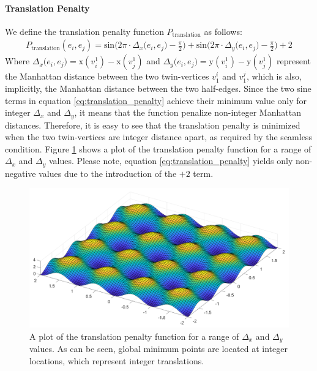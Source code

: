 \paragraph{Translation Penalty}
\label{paragraph:translation_penalty_function_method}
We define the translation penalty function $P_{\mathrm{translation}}$ as follows:
\begin{equation}\label{eq:translation_penalty}
\begin{split}
P_{\mathrm{translation}}\left(e_i,e_j\right) = \mathrm{sin} \Big( 2\pi\cdot\Delta_x\big(e_i,e_j\big) - \frac{\pi}{2}\Big) + \mathrm{sin} \Big( 2\pi\cdot\Delta_y\big(e_i,e_j\big) - \frac{\pi}{2}\Big) + 2
\end{split}
\end{equation}
Where $\Delta_x\big(e_i,e_j\big) = \mathrm{x}\left(v_i^1\right) - \mathrm{x}\left(v_j^1\right)$ and $\Delta_y\big(e_i,e_j\big) = \mathrm{y}\left(v_i^1\right) - \mathrm{y}\left(v_j^1\right)$ represent the Manhattan distance between the two twin-vertices $v^i_1$ and $v^j_1$, which is also, implicitly, the Manhattan distance between the two half-edges. Since the two sine terms in equation \ref{eq:translation_penalty} achieve their minimum value only for integer $\Delta_x$ and $\Delta_y$, it means that the function penalize non-integer Manhattan distances. Therefore, it is easy to see that the translation penalty is minimized when the two twin-vertices are integer distance apart, as required by the seamless condition. Figure \ref{fig:translation_penalty} shows a plot of the translation penalty function for a range of $\Delta_x$ and $\Delta_y$ values. Please note, equation \ref{eq:translation_penalty} yields only non-negative values due to the introduction of the $+2$ term.
\begin{figure}[ht]
\centering
\includegraphics[width=13cm]{figures/seamless/translation_penalty_function.png}
\caption[The Translation Penalty Function]{A plot of the translation penalty function for a range of $\Delta_x$ and $\Delta_y$ values. As can be seen, global minimum points are located at integer locations, which represent integer translations.}
\label{fig:translation_penalty}
\end{figure}
